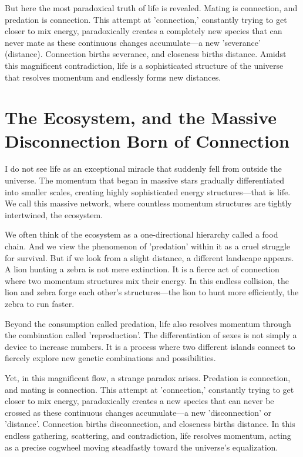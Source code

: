 \documentclass[11pt,a4paper]{article}
\begin{document}
But here the most paradoxical truth of life is revealed. Mating is connection, and predation is connection. This attempt at 'connection,' constantly trying to get closer to mix energy, paradoxically creates a completely new species that can never mate as these continuous changes accumulate—a new 'severance' (distance). Connection births severance, and closeness births distance. Amidst this magnificent contradiction, life is a sophisticated structure of the universe that resolves momentum and endlessly forms new distances.

\section*{The Ecosystem, and the Massive Disconnection Born of Connection}
I do not see life as an exceptional miracle that suddenly fell from outside the universe. The momentum that began in massive stars gradually differentiated into smaller scales, creating highly sophisticated energy structures—that is life. We call this massive network, where countless momentum structures are tightly intertwined, the ecosystem.

We often think of the ecosystem as a one-directional hierarchy called a food chain. And we view the phenomenon of 'predation' within it as a cruel struggle for survival. But if we look from a slight distance, a different landscape appears. A lion hunting a zebra is not mere extinction. It is a fierce act of connection where two momentum structures mix their energy. In this endless collision, the lion and zebra forge each other's structures—the lion to hunt more efficiently, the zebra to run faster.

Beyond the consumption called predation, life also resolves momentum through the combination called 'reproduction'. The differentiation of sexes is not simply a device to increase numbers. It is a process where two different islands connect to fiercely explore new genetic combinations and possibilities.

Yet, in this magnificent flow, a strange paradox arises. Predation is connection, and mating is connection. This attempt at 'connection,' constantly trying to get closer to mix energy, paradoxically creates a new species that can never be crossed as these continuous changes accumulate—a new 'disconnection' or 'distance'. Connection births disconnection, and closeness births distance. In this endless gathering, scattering, and contradiction, life resolves momentum, acting as a precise cogwheel moving steadfastly toward the universe's equalization.
\end{document}
